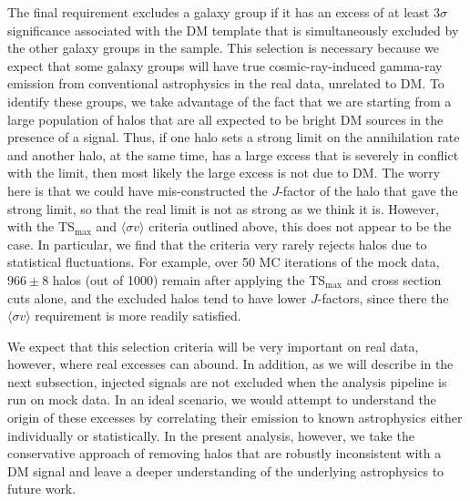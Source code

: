 The final requirement excludes a galaxy group if it has an excess of at least 3$\sigma$ significance associated with the DM template that is simultaneously excluded by the other galaxy groups in the sample.  This selection is necessary because we expect that some galaxy groups will have true cosmic-ray-induced gamma-ray emission from conventional astrophysics in the real data, unrelated to DM.  To identify these groups, we take advantage of the fact that we are starting from a large population of halos that are all expected to be bright DM sources in the presence of a signal.  Thus, if one halo sets a strong limit on the annihilation rate and another halo, at the same time, has a large excess that is severely in conflict with the limit, then most likely the large excess is not due to DM.  The worry here is that we could have mis-constructed the $J$-factor of the halo that gave the strong limit, so that the real limit is not as strong as we think it is.  However, with the TS$_\text{max}$ and $\langle \sigma  v \rangle$ criteria outlined above, this does not appear to be the case.  In particular, we find that the criteria very rarely rejects halos due to statistical fluctuations.  For example, over 50 MC iterations of the mock data, $966\pm8$ halos (out of 1000) remain after applying the TS$_\text{max}$ and cross section cuts alone, and the excluded halos tend to have lower $J$-factors, since there the $\langle \sigma v\rangle$ requirement is more readily satisfied.  

We expect that this selection criteria will be very important on real data, however, where real excesses can abound.  In addition, as we will describe in the next subsection, injected signals are not excluded when the analysis pipeline is run on mock data.  In an ideal scenario, we would attempt to understand the origin of these excesses by correlating their emission to known astrophysics either individually or statistically. In the present analysis, however, we take the conservative approach of removing halos that are robustly inconsistent with a DM signal and leave a deeper understanding of the underlying astrophysics to future work.

